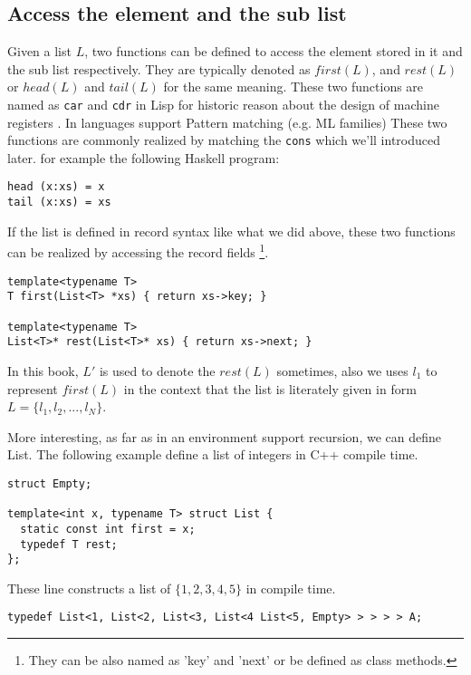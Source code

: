 \documentclass{article}
\begin{document}
\subsection{Access the element and the sub list}
Given a list $L$, two functions can be defined to access the element stored in it and
the sub list respectively. They are typically denoted as $first(L)$, and $rest(L)$ or
$head(L)$ and $tail(L)$ for the same meaning.
These two functions are named as \verb|car| and \verb|cdr| in Lisp for historic reason
about the design of machine registers \cite{SICP}. In languages support Pattern matching (e.g. ML families)
These two functions are commonly realized by matching the \verb|cons| which we'll introduced
later. for example the following Haskell program:

\lstset{language=Haskell}
\begin{lstlisting}
head (x:xs) = x
tail (x:xs) = xs
\end{lstlisting}

If the list is defined in record syntax like what we did above, these two functions can 
be realized by accessing the record fields \footnote{They can be also named as 'key' and 'next'
or be defined as class methods.}.

\lstset{language=C++}
\begin{lstlisting}
template<typename T>
T first(List<T> *xs) { return xs->key; }

template<typename T>
List<T>* rest(List<T>* xs) { return xs->next; }
\end{lstlisting}

In this book, $L'$ is used to denote the $rest(L)$ sometimes, also we uses $l_1$ to represent
$first(L)$ in the context that the list is literately given in form $L = \{ l_1, l_2, ..., l_N\}$.

More interesting, as far as in an environment support recursion, we can define List. The following
example define a list of integers in C++ compile time.

\lstset{language=C++}
\begin{lstlisting}
struct Empty;

template<int x, typename T> struct List {
  static const int first = x;
  typedef T rest;
};
\end{lstlisting}

These line constructs a list of $\{1, 2, 3, 4, 5\}$ in compile time.

\begin{lstlisting}
typedef List<1, List<2, List<3, List<4 List<5, Empty> > > > > A;
\end{lstlisting}
\end{document}
